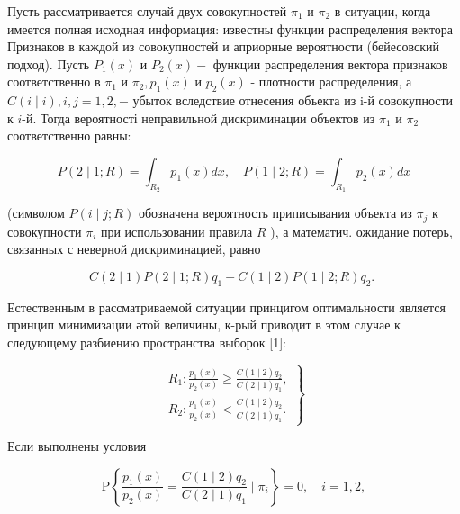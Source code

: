 \documentclass[10pt]{article}
\begin{document}
Пусть рассматривается случай двух совокупностей $\pi_{1}$ и $\pi_{2}$ в ситуации, когда имеется полная исходная информация: известны функции распределения вектора Признаков в каждой из совокупностей и априорные вероятности (бейесовский подход). Пусть $P_{1}(x)$ и $P_{2}(x)-$ функции распределения вектора признаков соответственно в $\pi_{1}$ и $\pi_{2}, p_{1}(x)$ и $p_{2}(x)$ - плотности распределения, а $C(i \mid i), i, j=1,2,-$ убыток вследствие отнесения объекта из i-й совокупности к $i$-й. Тогда вероятності неправильной дискриминации объектов из $\pi_{1}$ и $\pi_{2}$ соответственно равны:



\[

P(2 \mid 1 ; R)=\int_{R_{2}} p_{1}(x) d x, \quad P(1 \mid 2 ; R)=\int_{R_{1}} p_{2}(x) d x

\]



(символом $P(i \mid j ; R)$ обозначена вероятность приписывания объекта из $\pi_{j}$ к совокупности $\pi_{i}$ при использовании правила $R$ ), а математич. ожидание потерь, связанных с неверной дискриминацией, равно



\[

C(2 \mid 1) P(2 \mid 1 ; R) q_{1}+C(1 \mid 2) P(1 \mid 2 ; R) q_{2} \text {. }

\]



Естественным в рассматриваемой ситуации принцигом оптимальности является принцип минимизации әтой величины, к-рый приводит в этом случае к следующему разбиению пространства выборок [1]:



\[

\left.\begin{array}{l}

R_{1}: \frac{p_{1}(x)}{p_{2}(x)} \geqslant \frac{C(1 \mid 2) q_{2}}{C(2 \mid 1) q_{1}}, \\

R_{2}: \frac{p_{1}(x)}{p_{2}(x)}<\frac{C(1 \mid 2) q_{2}}{C(2 \mid 1) q_{1}} .

\end{array}\right\}

\]



Если выполнены условия



\[

\mathrm{P}\left\{\frac{p_{1}(x)}{p_{2}(x)}=\frac{C(1 \mid 2) q_{2}}{C(2 \mid 1) q_{1}} \mid \pi_{i}\right\}=0, \quad i=1,2,

\]
\end{document}
